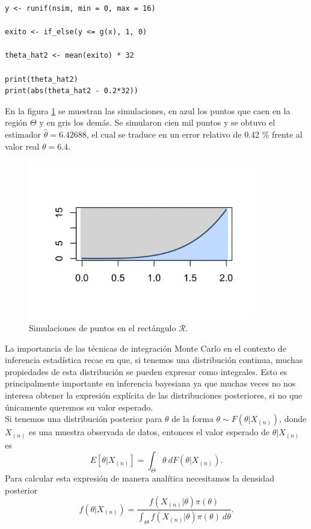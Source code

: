\documentclass[11pt,a4paper]{article}
\begin{document}
\begin{lstlisting}
y <- runif(nsim, min = 0, max = 16)

exito <- if_else(y <= g(x), 1, 0)

theta_hat2 <- mean(exito) * 32

print(theta_hat2)
print(abs(theta_hat2 - 0.2*32))
\end{lstlisting}

En la figura \ref{fig:sim_hx} se muestran las simulaciones, en azul los puntos que caen en la región $\Theta$ y en gris los demás. Se simularon cien mil puntos y se obtuvo el estimador $\hat{\theta} = 6.42688$, el cual se traduce en un error relativo de 0.42 \% frente al valor real $\theta = 6.4$.

\begin{figure}[H] 
\centering\includegraphics[width=10cm]{sim_hx.png}
\caption{Simulaciones de puntos en el rectángulo $\mathcal{R}$.}
\label{fig:sim_hx}
\end{figure}

La importancia de las técnicas de integración Monte Carlo en el contexto de inferencia estadística recae en que, si tenemos una distribución continua, muchas propiedades de esta distribución se pueden expresar como integrales. Esto es principalmente importante en inferencia bayesiana ya que muchas veces no nos interesa obtener la expresión explícita de las distribuciones posteriores, si no que únicamente queremos su valor esperado.\\

Si tenemos una distribución posterior para $\theta$ de la forma $\theta \sim F(\theta | X_{(n)})$, donde $X_{(n)}$ es una muestra observada de datos, entonces el valor esperado de $\theta| X_{(n)}$ es
\begin{equation}
\label{eq:exp_theta}
E[\theta | X_{(n)}] = \int_{\Theta} \theta \ dF(\theta | X_{(n)}).
\end{equation}
Para calcular esta expresión de manera analítica necesitamos la densidad posterior $$f(\theta | X_{(n)}) = \frac{f(X_{(n)} | \theta)\pi (\theta)}{\int_{\Theta} f(X_{(n)} | \theta)\pi (\theta) \ d\theta}.$$\\
\end{document}
